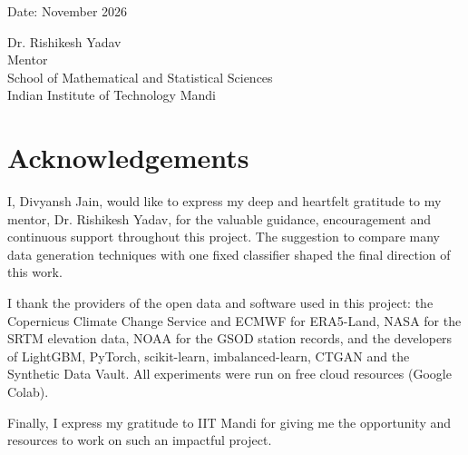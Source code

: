\documentclass[12pt,a4paper]{report}
\newcommand{\StudentName}{Divyansh Jain}
\newcommand{\SupervisorName}{Dr. Rishikesh Yadav}
\newcommand{\SupervisorTitle}{Mentor}
\newcommand{\SchoolName}{School of Mathematical and Statistical Sciences}
\newcommand{\CertificateDate}{November 2026}
\begin{document}
\vspace{3.5cm}
\noindent
\begin{minipage}[b]{0.45\textwidth}
Date: \CertificateDate
\end{minipage}\hfill
\begin{minipage}[b]{0.52\textwidth}
\raggedleft
\SupervisorName\\
\SupervisorTitle\\
\SchoolName\\
Indian Institute of Technology Mandi
\end{minipage}

\chapter*{Acknowledgements}
I, \StudentName, would like to express my deep and heartfelt gratitude to my mentor, \SupervisorName, for the
valuable guidance, encouragement and continuous support throughout this project. The suggestion to compare many
data generation techniques with one fixed classifier shaped the final direction of this work.

I thank the providers of the open data and software used in this project: the Copernicus Climate Change Service
and ECMWF for ERA5-Land, NASA for the SRTM elevation data, NOAA for the GSOD station records, and the developers
of LightGBM, PyTorch, scikit-learn, imbalanced-learn, CTGAN and the Synthetic Data Vault. All experiments were run
on free cloud resources (Google Colab).

Finally, I express my gratitude to IIT Mandi for giving me the opportunity and resources to work on such an
impactful project.

\end{document}
